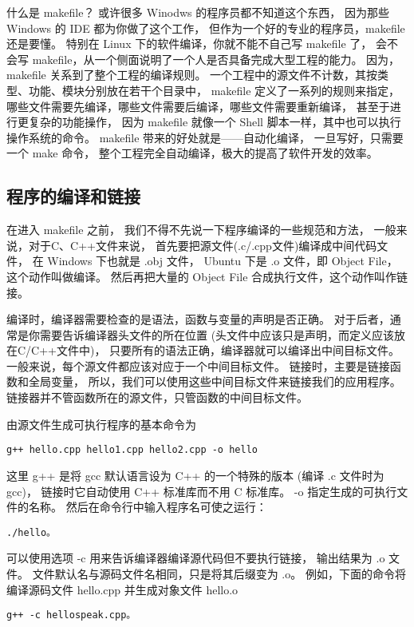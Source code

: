 
什么是 makefile？
或许很多 Winodws 的程序员都不知道这个东西，
因为那些 Windows 的 IDE 都为你做了这个工作，
但作为一个好的专业的程序员，makefile 还是要懂。
特别在 Linux 下的软件编译，你就不能不自己写 makefile 了，
会不会写 makefile，从一个侧面说明了一个人是否具备完成大型工程的能力。
因为，makefile 关系到了整个工程的编译规则。
一个工程中的源文件不计数，其按类型、功能、模块分别放在若干个目录中，
makefile 定义了一系列的规则来指定，
哪些文件需要先编译，哪些文件需要后编译，哪些文件需要重新编译，
甚至于进行更复杂的功能操作，
因为 makefile 就像一个 Shell 脚本一样，其中也可以执行操作系统的命令。
makefile 带来的好处就是——自动化编译，
一旦写好，只需要一个 make 命令，
整个工程完全自动编译，极大的提高了软件开发的效率。


\subsection{程序的编译和链接}

在进入 makefile 之前，
我们不得不先说一下程序编译的一些规范和方法，
一般来说，对于C、C++文件来说，
首先要把源文件(.c/.cpp文件)编译成中间代码文件，
在 Windows 下也就是 .obj 文件，
Ubuntu 下是 .o 文件，即 Object File，这个动作叫做编译。
然后再把大量的 Object File 合成执行文件，这个动作叫作链接。   

编译时，编译器需要检查的是语法，函数与变量的声明是否正确。
对于后者，通常是你需要告诉编译器头文件的所在位置
(头文件中应该只是声明，而定义应该放在C/C++文件中)，
只要所有的语法正确，编译器就可以编译出中间目标文件。
一般来说，每个源文件都应该对应于一个中间目标文件。 
链接时，主要是链接函数和全局变量，
所以，我们可以使用这些中间目标文件来链接我们的应用程序。
链接器并不管函数所在的源文件，只管函数的中间目标文件。

由源文件生成可执行程序的基本命令为
\begin{verbatim}
g++ hello.cpp hello1.cpp hello2.cpp -o hello
\end{verbatim}
这里 g++ 是将 gcc 默认语言设为 C++ 的一个特殊的版本
(编译 .c 文件时为 gcc)，
链接时它自动使用 C++ 标准库而不用 C 标准库。
-o 指定生成的可执行文件的名称。
然后在命令行中输入程序名可使之运行：
\begin{verbatim}
./hello。
\end{verbatim}

可以使用选项 -c 用来告诉编译器编译源代码但不要执行链接，
输出结果为 .o 文件。
文件默认名与源码文件名相同，只是将其后缀变为 .o。
例如，下面的命令将编译源码文件 hello.cpp 并生成对象文件 hello.o
\begin{verbatim}
g++ -c hellospeak.cpp。
\end{verbatim}

